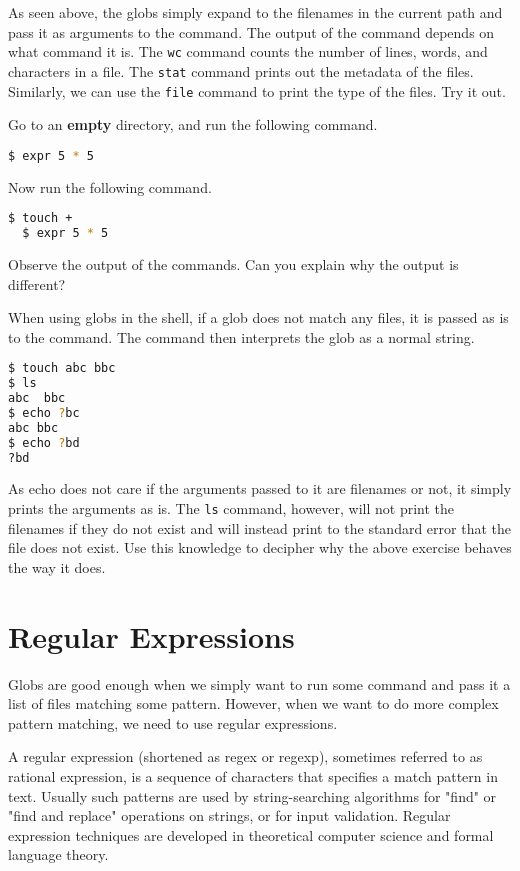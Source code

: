 As seen above, the globs simply expand to the filenames in the current path
and pass it as arguments to the command. The output of the command depends
on what command it is. The \lstinline|wc| command counts the number of lines,
words, and characters in a file. The \lstinline|stat| command prints out the
metadata of the files. Similarly, we can use the \lstinline|file| command to
print the type of the files. Try it out.

\begin{exercise}
  Go to an \textbf{empty} directory, and run the following command.
  \begin{lstlisting}[language=bash]
  $ expr 5 * 5
  \end{lstlisting}
  Now run the following command.
  \begin{lstlisting}[language=bash]
  $ touch +
  $ expr 5 * 5
  \end{lstlisting}
  Observe the output of the commands.
  Can you explain why the output is different?
\end{exercise}

When using globs in the shell, if a glob does not match any files, it is
passed as is to the command. The command then interprets the glob as a
normal string.

\begin{lstlisting}[language=bash]
$ touch abc bbc
$ ls
abc  bbc
$ echo ?bc
abc bbc
$ echo ?bd
?bd
\end{lstlisting}

As echo does not care if the arguments passed to it are filenames or not,
it simply prints the arguments as is. The \lstinline|ls| command, however,
will not print the filenames if they do not exist and will instead print
to the standard error that the file does not exist. Use this knowledge
to decipher why the above exercise behaves the way it does.

\section{Regular Expressions}

Globs are good enough when we simply want to run some command and pass
it a list of files matching some pattern. However, when we want to
do more complex pattern matching, we need to use regular expressions.

\begin{definition}
A regular expression (shortened as regex or regexp), sometimes
referred to as rational expression, is a sequence of characters
that specifies a match pattern in text. Usually such patterns are
used by string-searching algorithms for "find" or "find and replace"
operations on strings, or for input validation. Regular expression
techniques are developed in theoretical computer science and formal
language theory.
\end{definition}

